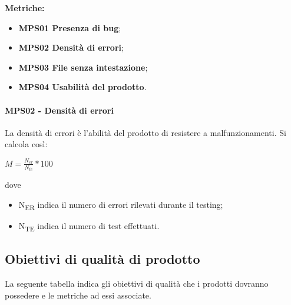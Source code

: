 \documentclass[../piano_di_qualifica.tex]{subfiles}
\begin{document}
\textbf{Metriche:}
\smallbreak
\begin{itemize}
	\item \textbf{MPS01 Presenza di bug};
	\item \textbf{MPS02 Densità di errori};
	\item \textbf{MPS03 File senza intestazione};
	\item \textbf{MPS04 Usabilità del prodotto}.
\end{itemize}


\paragraph{MPS02 - Densità di errori}
La densità di errori è l'abilità del prodotto di resistere a malfunzionamenti. Si calcola così:\par

\begin{center}
	$M = \frac{N_{er}}{N_{te}} * 100$
\end{center}

dove
\smallbreak
\begin{itemize}
	\item N\textsubscript{ER} indica il numero di errori rilevati durante il testing;
	\item N\textsubscript{TE} indica il numero di test effettuati.
\end{itemize}

\subsection{Obiettivi di qualità di prodotto}
La seguente tabella indica gli obiettivi di qualità che i prodotti dovranno possedere e le metriche ad essi associate.\\
\end{document}
